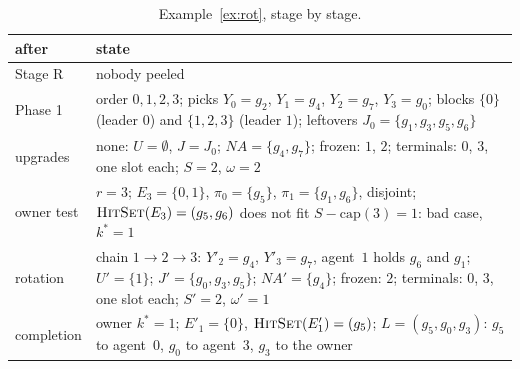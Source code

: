 \documentclass[runningheads,11pt]{llncs}
\newcommand{\NA}{\mathit{NA}}
\newcommand{\capa}{\mathrm{cap}}
\newcommand{\HitSet}{\textup{\textsc{HitSet}}}
\begin{document}
\begin{table}[tbp]
\caption{Example~\ref{ex:rot}, stage by stage.}\label{tab:ex2stages}
\centering\small
\setlength{\tabcolsep}{4pt}\begin{tabular}{@{}>{\raggedright\arraybackslash}p{}>{\raggedright\arraybackslash}p{}@{}}
\toprule
after & state \\
\midrule
Stage R & nobody peeled \\
Phase 1 & order $0,1,2,3$; picks $Y_0=g_2$, $Y_1=g_4$, $Y_2=g_7$, $Y_3=g_0$; blocks $\{0\}$ (leader $0$) and $\{1,2,3\}$ (leader $1$); leftovers $J_0=\{g_1,g_3,g_5,g_6\}$ \\
upgrades & none: $U=\emptyset$, $J=J_0$; $\NA=\{g_4,g_7\}$; frozen: $1$, $2$; terminals: $0$, $3$, one slot each; $S=2$, $\omega=2$ \\
owner test & $r=3$; $E_3=\{0,1\}$, $\pi_0=\{g_5\}$, $\pi_1=\{g_1,g_6\}$, disjoint; $\HitSet(E_3)=(g_5,g_6)$ does not fit $S-\capa(3)=1$: bad case, $k^*=1$ \\
rotation & chain $1\to2\to3$: $Y'_2=g_4$, $Y'_3=g_7$, agent~$1$ holds $g_6$ and $g_1$; $U'=\{1\}$; $J'=\{g_0,g_3,g_5\}$; $\NA'=\{g_4\}$; frozen: $2$; terminals: $0$, $3$, one slot each; $S'=2$, $\omega'=1$ \\
completion & owner $k^*=1$; $E'_1=\{0\}$, $\HitSet(E'_1)=(g_5)$; $L=(g_5,g_0,g_3)$: $g_5$ to agent~$0$, $g_0$ to agent~$3$, $g_3$ to the owner \\
\bottomrule
\end{tabular}
\end{table}
\end{document}
